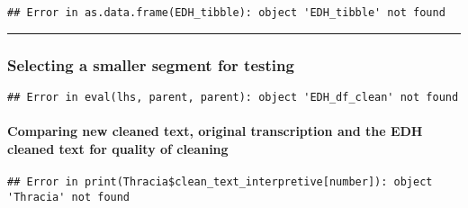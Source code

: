 \documentclass[]{article}
\newenvironment{Shaded}{\begin{snugshade}}{\end{snugshade}}
\newcommand{\CommentTok}[1]{\textcolor[rgb]{0.56,0.35,0.01}{\textit{#1}}}
\newcommand{\DecValTok}[1]{\textcolor[rgb]{0.00,0.00,0.81}{#1}}
\newcommand{\KeywordTok}[1]{\textcolor[rgb]{0.13,0.29,0.53}{\textbf{#1}}}
\newcommand{\NormalTok}[1]{#1}
\newcommand{\OperatorTok}[1]{\textcolor[rgb]{0.81,0.36,0.00}{\textbf{#1}}}
\newcommand{\StringTok}[1]{\textcolor[rgb]{0.31,0.60,0.02}{#1}}
\let\oldparagraph\paragraph
\renewcommand{\paragraph}[1]{\oldparagraph{#1}\mbox{}}
\begin{document}
\begin{verbatim}
## Error in as.data.frame(EDH_tibble): object 'EDH_tibble' not found
\end{verbatim}

\begin{center}\rule{0.5\linewidth}{0.5pt}\end{center}

\hypertarget{selecting-a-smaller-segment-for-testing}{%
\subsubsection{Selecting a smaller segment for
testing}\label{selecting-a-smaller-segment-for-testing}}

\begin{Shaded}
\end{Shaded}

\begin{verbatim}
## Error in eval(lhs, parent, parent): object 'EDH_df_clean' not found
\end{verbatim}

\hypertarget{comparing-new-cleaned-text-original-transcription-and-the-edh-cleaned-text-for-quality-of-cleaning}{%
\paragraph{Comparing new cleaned text, original transcription and the
EDH cleaned text for quality of
cleaning}\label{comparing-new-cleaned-text-original-transcription-and-the-edh-cleaned-text-for-quality-of-cleaning}}

\begin{Shaded}
\end{Shaded}

\begin{verbatim}
## Error in print(Thracia$clean_text_interpretive[number]): object 'Thracia' not found
\end{verbatim}
\end{document}
